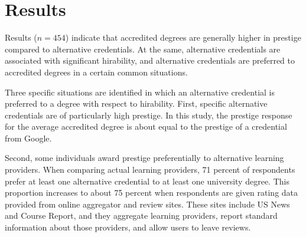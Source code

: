 \documentclass[review]{elsarticle}
\begin{document}

\section{Results}

Results ($n = 454$) indicate that accredited degrees are generally higher in prestige compared to alternative credentials.
At the same, alternative credentials are associated with significant hirability,
and alternative credentials are preferred to accredited degrees in a certain common situations.

Three specific situations are identified in which an alternative credential is preferred to a degree with respect to hirability.
First, specific alternative credentials are of particularly high prestige.
In this study, the prestige response for the average accredited degree is about equal to the prestige of a credential from Google.

Second, some individuals award prestige preferentially to alternative learning providers.
When comparing actual learning providers,
71 percent of respondents prefer at least one alternative credential to at least one university degree.
This proportion increases to about 75 percent when respondents are given rating data provided from online aggregator and review sites.
These sites include US News and Course Report, and they aggregate learning providers,
report standard information about those providers,
and allow users to leave reviews.
\end{document}
